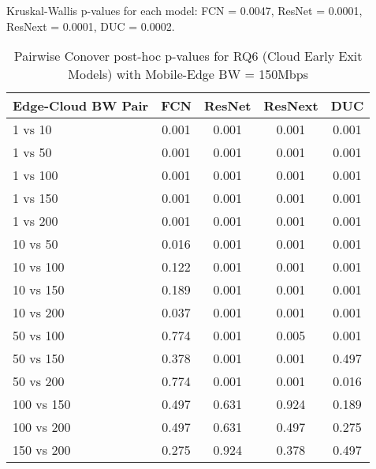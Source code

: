 \begin{table}[h]
\centering
\caption{Pairwise Conover post-hoc p-values for RQ6 (Cloud Early Exit Models) with Mobile-Edge BW = 150Mbps}
\label{tab:conover_cloud_earlyexit_me150}
\smallskip
Kruskal-Wallis p-values for each model: FCN = 0.0047, ResNet = 0.0001, ResNext = 0.0001, DUC = 0.0002.

\begin{tabular}{lcccc}
\toprule
Edge-Cloud BW Pair & FCN & ResNet & ResNext & DUC \\
\midrule
1 vs 10 & 0.001 & 0.001 & 0.001 & 0.001 \\
1 vs 50 & 0.001 & 0.001 & 0.001 & 0.001 \\
1 vs 100 & 0.001 & 0.001 & 0.001 & 0.001 \\
1 vs 150 & 0.001 & 0.001 & 0.001 & 0.001 \\
1 vs 200 & 0.001 & 0.001 & 0.001 & 0.001 \\
10 vs 50 & 0.016 & 0.001 & 0.001 & 0.001 \\
10 vs 100 & 0.122 & 0.001 & 0.001 & 0.001 \\
10 vs 150 & 0.189 & 0.001 & 0.001 & 0.001 \\
10 vs 200 & 0.037 & 0.001 & 0.001 & 0.001 \\
50 vs 100 & 0.774 & 0.001 & 0.005 & 0.001 \\
50 vs 150 & 0.378 & 0.001 & 0.001 & 0.497 \\
50 vs 200 & 0.774 & 0.001 & 0.001 & 0.016 \\
100 vs 150 & 0.497 & 0.631 & 0.924 & 0.189 \\
100 vs 200 & 0.497 & 0.631 & 0.497 & 0.275 \\
150 vs 200 & 0.275 & 0.924 & 0.378 & 0.497 \\
\bottomrule
\end{tabular}
\end{table}

